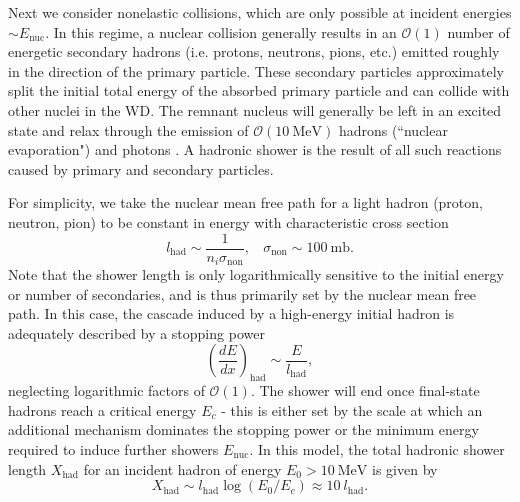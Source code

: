 \documentclass[twocolumn,showpacs,preprintnumbers,amsmath,amssymb,prd]{revtex4}
\newcommand{\OO}{\mathcal{O}}
\def\r{\right)}
\def\l{\left(}
\begin{document}
\begin{appendices}
Next we consider nonelastic collisions, which are only possible at incident energies $\sim E_\text{nuc}$. In this regime, a nuclear collision generally results in an $\OO(1)$ number of energetic secondary hadrons (i.e. protons, neutrons, pions, etc.) emitted roughly in the direction of the primary particle. These secondary particles approximately split the initial total energy of the absorbed primary particle and can collide with other nuclei in the WD. The remnant nucleus will generally be left in an excited state and relax through the emission of $\OO(10 ~\text{MeV})$ hadrons (``nuclear evaporation") and photons \cite{Rossi}. A hadronic shower is the result of all such reactions caused by primary and secondary particles.

For simplicity, we take the nuclear mean free path for a light hadron (proton, neutron, pion) to be constant in energy with characteristic cross section
\begin{equation}
l_\text{had} \sim  \frac{1}{n_i \sigma_\text{non}}, ~~~~ \sigma_\text{non} \sim 100 ~\text{mb}.
\end{equation}
Note that the shower length is only logarithmically sensitive to the initial energy or number of secondaries, and is thus primarily set by the nuclear mean free path. In this case, the cascade induced by a high-energy initial hadron is adequately described by a stopping power
\begin{equation}
\label{eq:nucshower}
\l \frac{dE}{dx}\r_\text{had} \sim \frac{E}{l_\text{had}},
\end{equation}
neglecting logarithmic factors of $\OO(1)$. The shower will end once final-state hadrons reach a critical energy $E_c$ - this is either set by the scale at which an additional mechanism dominates the stopping power or the minimum energy required to induce further showers $E_\text{nuc}$. In this model, the total hadronic shower length $X_{\text{had}}$ for an incident hadron of energy $E_0 > 10 ~\text{MeV}$ is given by
\begin{equation}
X_{\text{had}} \sim l_\text{had} \log{(E_0/E_c)} \approx 10 ~l_\text{had}.
\end{equation}
 

\end{appendices}
\end{document}
